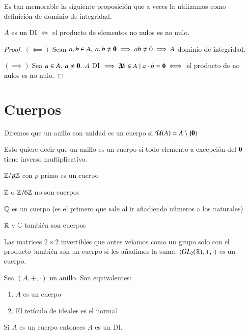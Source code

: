 Es tan memorable la siguiente proposición que a veces la utilizamos como definición de dominio de integridad.

\begin{pro}
	$A$ es un DI $\iff$ el producto de elementos no nulos es no nulo.
\end{pro}

\begin{proof}
	$(\impliedby)$ Sean $a,b \in A,\ a,b \neq \mathbf{0} \implies ab \neq 0 \implies A$ dominio de integridad.
	
	$(\implies)$ Sea $a \in A,\ a \neq \mathbf{0}$. $A$ DI $\implies \nexists b \in A \mid a\cdot b = \mathbf{0} \iff$ el producto de no nulos es no nulo.
\end{proof}


\section{Cuerpos}

\begin{dfn}[Cuerpo]
	Diremos que un anillo con unidad es un cuerpo si $\mathcal{U}(A) = A \setminus \{\mathbf{0}\}$
\end{dfn}

Esto quiere decir que un anillo es un cuerpo si todo elemento a excepción del $\mathbf{0}$ tiene inverso multiplicativo.

\begin{ej}
	\item $\mathbb{Z}/p\mathbb{Z}$ con $p$ primo es un cuerpo
	\item $\mathbb{Z}$ o $\mathbb{Z}/6\mathbb{Z}$ no son cuerpos
	\item $\mathbb{Q}$ es un cuerpo (es el primero que sale al ir añadiendo números a los naturales)
	\item $\mathbb{R}$ y $\mathbb{C}$ también son cuerpos
	\item Las matrices $2 \times 2$ invertibles que antes veíamos como un grupo solo con el producto también son un cuerpo si les añadimos la suma: $(GL_2(\mathbb{R}), +, \cdot)$ es un cuerpo.
\end{ej}

\begin{pro}
	Sea $(A, +, \cdot)$ un anillo. Son equivalentes:
	\begin{enumerate}
		\item $A$ es un cuerpo
		\item El retículo de ideales es el normal
	\end{enumerate}
\end{pro}

\begin{pro}
	Si $A$ es un cuerpo entonces $A$ es un DI.
\end{pro}


